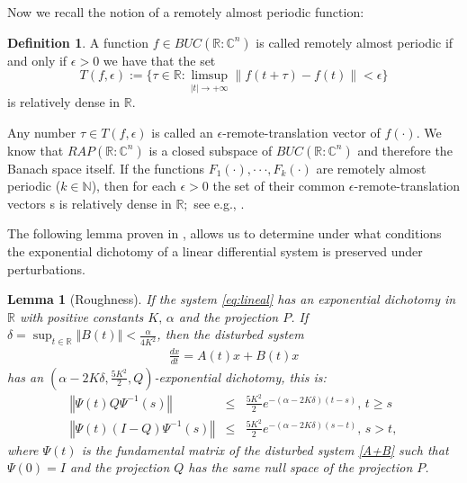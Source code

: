 \documentclass[english,reqno]{amsart}
\numberwithin{equation}{section}
\theoremstyle{plain}
\newtheorem{lem}[thm]{Lemma}
\theoremstyle{definition}
\newtheorem{defn}{Definition}[section]
\theoremstyle{remark}
\begin{document}
Now we recall the notion of a remotely almost periodic function:

\begin{defn}\label{rap}
A function $f\in BUC({\mathbb R } : {\mathbb C }^{n})$ is called remotely almost periodic if and only if $\epsilon>0$ we have that the set
$$
T(f,\epsilon):=\Biggl\{ \tau \in {\mathbb R}: \limsup_{|t|\rightarrow +\infty}\| f(t+\tau)-f(t)\|<\epsilon\Biggr\}
$$
is relatively dense in $ {\mathbb R}.$ 
\end{defn}

Any number $\tau \in T(f,\epsilon)$ is called an $\epsilon$-remote-translation vector of $f(\cdot).$ We know that $RAP({\mathbb R } : {\mathbb C }^{n})$ is a closed subspace of 
$BUC({\mathbb R } : {\mathbb C }^{n})$ and therefore the Banach space itself. 		
If the functions $F_{1}(\cdot), \cdot \cdot \cdot, F_{k}(\cdot)$ are remotely almost periodic ($k\in {\mathbb N}$), then for each $\epsilon>0$ the set of their common
$\epsilon$-remote-translation vectors s is relatively dense in ${\mathbb R};$ see e.g., \cite[Proposition 2.3]{fyang1}.


The following lemma proven in \cite{coppel_book}, allows us to determine under what conditions the exponential dichotomy of a linear differential system is preserved under perturbations.

\begin{lem}[Roughness]\label{perturbacion_mantiene_dicotomia}
If the system \eqref{eq:lineal} has an exponential dichotomy in $\mathbb{R}$
with positive constants $K,\,\alpha$ and the projection $P$. If $\delta=\sup_{t\in\mathbb{R}}\left\Vert B\left(t\right)\right\Vert <\frac{\alpha}{4K^{2}}$, then the disturbed system 
\begin{eqnarray}
\frac{dx}{dt}=A\left(t\right)x+B\left(t\right)x \label{A+B}
\end{eqnarray}
has an $(\alpha-2K\delta,\frac{5K^{2}}{2},Q)$-exponential dichotomy, this is: 
\begin{eqnarray*}
\left\Vert \Psi\left(t\right)Q\Psi^{-1}\left(s\right)\right\Vert  & \leq & \frac{5K^{2}}{2}e^{-\left(\alpha-2K\delta\right)\left(t-s\right)},\, t\geq s\\
\left\Vert \Psi\left(t\right)\left(I-Q\right)\Psi^{-1}\left(s\right)\right\Vert  & \leq & \frac{5K^{2}}{2}e^{-\left(\alpha-2K\delta\right)\left(s-t\right)},\, s> t,
\end{eqnarray*}
where $\Psi\left(t\right)$ is the fundamental matrix of the disturbed system \eqref{A+B} such that $\Psi\left(0\right)=I$ and the projection $Q$ has the same null space of the projection $P$.
\end{lem}
\end{document}
